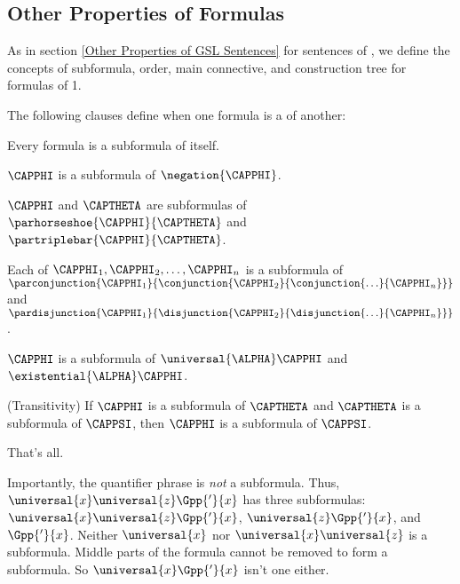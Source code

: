 \subsection{Other Properties of Formulas}\label{Other Properties of Formulas1} 
As in section \ref{Other Properties of GSL Sentences} for sentences of \GSL{}, we define the concepts of subformula, order, main connective, and construction tree for formulas of \GQL{}1. 
\begin{majorILnc}{}
The following clauses define when one formula is a  of another:
\begin{cenumerate}
	\item Every formula is a subformula of itself.
	\item $\CAPPHI$ is a subformula of $\negation{\CAPPHI}$.
	\item $\CAPPHI$ and $\CAPTHETA$ are subformulas of $\parhorseshoe{\CAPPHI}{\CAPTHETA}$ and $\partriplebar{\CAPPHI}{\CAPTHETA}$.
	\item Each of $\CAPPHI_1,\CAPPHI_2,\ldots,\CAPPHI_{\integer{n}}$ is a subformula of $\parconjunction{\CAPPHI_1}{\conjunction{\CAPPHI_2}{\conjunction{\ldots}{\CAPPHI_{\integer{n}}}}}$\\ and $\pardisjunction{\CAPPHI_1}{\disjunction{\CAPPHI_2}{\disjunction{\ldots}{\CAPPHI_{\integer{n}}}}}$.
	\item $\CAPPHI$ is a subformula of $\universal{\ALPHA}\CAPPHI$ and $\existential{\ALPHA}\CAPPHI$.
	\item (Transitivity) If $\CAPPHI$ is a subformula of $\CAPTHETA$ and $\CAPTHETA$ is a subformula of $\CAPPSI$, then $\CAPPHI$ is a subformula of $\CAPPSI$.
	\item That's all. 
\end{cenumerate}

\end{majorILnc}
\noindent{}Importantly, the quantifier phrase is \emph{not} a subformula. 
Thus, $\universal{\variable{x}}\universal{\variable{z}}\Gpp{'}{\variable{x}}$ has three subformulas: $\universal{\variable{x}}\universal{\variable{z}}\Gpp{'}{\variable{x}}$, $\universal{\variable{z}}\Gpp{'}{\variable{x}}$, and $\Gpp{'}{\variable{x}}$. 
Neither $\universal{\variable{x}}$ nor $\universal{\variable{x}}\universal{\variable{z}}$ is a subformula.
Middle parts of the formula cannot be removed to form a subformula. So $\universal{\variable{x}}\Gpp{'}{\variable{x}}$ isn't one either.

